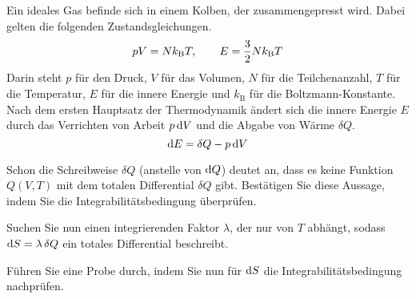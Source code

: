 \begin{atiTask}[
  title = Ideales Gas
]
  Ein ideales Gas befinde sich in einem Kolben, der zusammengepresst wird.
  Dabei gelten die folgenden Zustandsgleichungen.
  \[
    pV = Nk_\text{B}T
    ,\qquad
    E = \frac{3}{2}Nk_\text{B}T
  \]
  Darin steht $p$ für den Druck, $V$ für das Volumen, $N$ für die Teilchenanzahl, $T$ für die Temperatur, $E$ für die innere Energie und $k_\text{B}$ für die Boltzmann-Konstante.
  Nach dem ersten Hauptsatz der Thermodynamik ändert sich die innere Energie $E$ durch das Verrichten von Arbeit $p\,\mathrm{d} V$ und die Abgabe von Wärme $\delta Q$.
  \[
    \mathrm{d} E = \delta Q - p\,\mathrm{d} V
  \]
  \begin{atiSubtasks}
    \item{
      Schon die Schreibweise $\delta Q$ (anstelle von $\mathrm{d} Q$) deutet an, dass es keine Funktion $Q(V,T)$ mit dem totalen Differential $\delta Q$ gibt.
      Bestätigen Sie diese Aussage, indem Sie die Integrabilitätsbedingung überprüfen.
    }
    \item{
      Suchen Sie nun einen integrierenden Faktor $\lambda$, der nur von $T$ abhängt, sodass $\mathrm{d} S = \lambda\,\delta Q$ ein totales Differential beschreibt.
    }
    \item{
      Führen Sie eine Probe durch, indem Sie nun für $\mathrm{d} S$ die Integrabilitätsbedingung nachprüfen.
    }
  \end{atiSubtasks}
\end{atiTask}